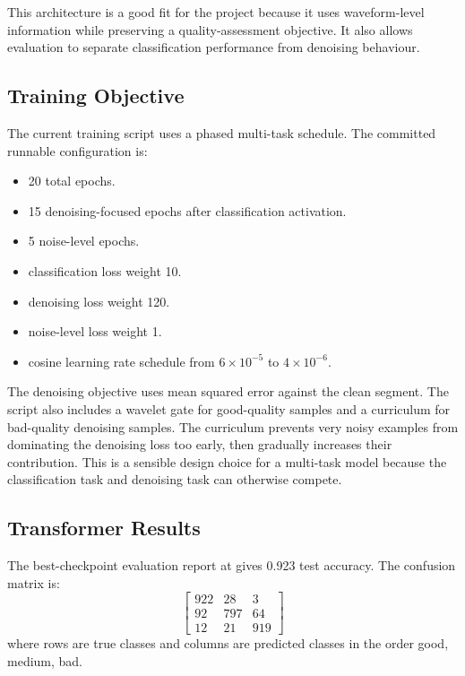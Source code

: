 \documentclass[11pt,a4paper]{article}
\begin{document}
This architecture is a good fit for the project because it uses waveform-level information while preserving a quality-assessment objective. It also allows evaluation to separate classification performance from denoising behaviour.

\subsection{Training Objective}

The current training script  uses a phased multi-task schedule. The committed runnable configuration is:
\begin{itemize}
  \item 20 total epochs.
  \item 15 denoising-focused epochs after classification activation.
  \item 5 noise-level epochs.
  \item classification loss weight 10.
  \item denoising loss weight 120.
  \item noise-level loss weight 1.
  \item cosine learning rate schedule from $6 \times 10^{-5}$ to $4 \times 10^{-6}$.
\end{itemize}

The denoising objective uses mean squared error against the clean segment. The script also includes a wavelet gate for good-quality samples and a curriculum for bad-quality denoising samples. The curriculum prevents very noisy examples from dominating the denoising loss too early, then gradually increases their contribution. This is a sensible design choice for a multi-task model because the classification task and denoising task can otherwise compete.

\subsection{Transformer Results}

The best-checkpoint evaluation report at  gives 0.923 test accuracy. The confusion matrix is:
\[
\begin{bmatrix}
922 & 28 & 3 \\
92 & 797 & 64 \\
12 & 21 & 919
\end{bmatrix}
\]
where rows are true classes and columns are predicted classes in the order good, medium, bad.
\end{document}
